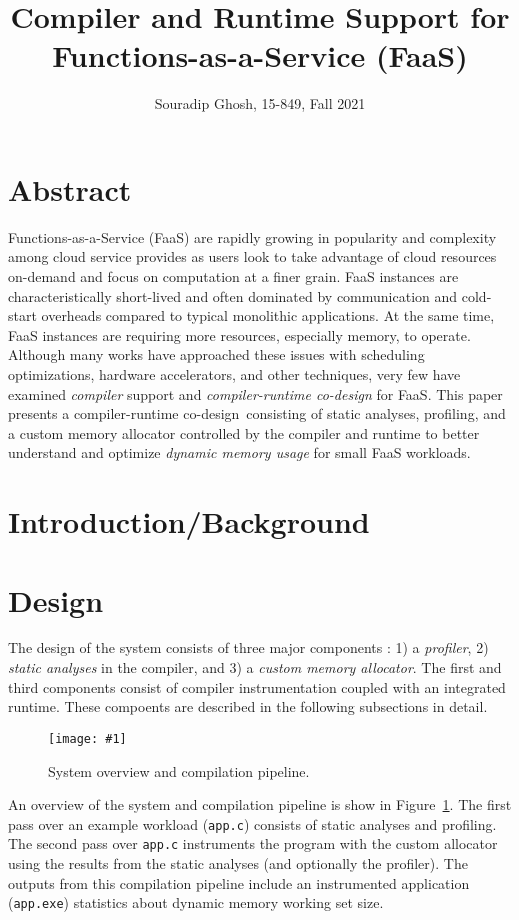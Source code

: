 \documentclass{article}
\title{Compiler and Runtime Support for Functions-as-a-Service (FaaS)}
\date{}
\author{Souradip Ghosh, 15-849, Fall 2021}
\def\pagefig#1{\texttt{[image: \#1]}}
\def\crcd{compiler-runtime co-design}
\begin{document}
\maketitle

\section{Abstract}
Functions-as-a-Service (FaaS) are rapidly growing in popularity and 
complexity among cloud service provides as users look to take 
advantage of cloud resources on-demand and focus on computation
at a finer grain. FaaS instances are characteristically short-lived
and often dominated by communication and cold-start overheads compared
to typical monolithic applications. At the same time, FaaS instances
are requiring more resources, especially memory, to operate. Although
many works have approached these issues with scheduling optimizations,
hardware accelerators, and other techniques, very few have examined
\textit{compiler} support and \textit{\crcd} for FaaS. This paper presents 
a \crcd\ consisting of static analyses, profiling, and a custom memory 
allocator controlled by the compiler and runtime to better understand 
and optimize \textit{dynamic memory usage} for small FaaS workloads.

\section{Introduction/Background}

\section{Design}
The design of the system consists of three major components : 1) a \textit{profiler},
2) \textit{static analyses} in the compiler, and 3) a \textit{custom memory allocator}.
The first and third components consist of compiler instrumentation coupled with an 
integrated runtime. These compoents are described in the following subsections
in detail. 

\begin{figure}
    \centerline{\pagefig{figs/sys.pdf}}
    \caption{System overview and compilation pipeline. }  
	\label{fig:sys}
\end{figure}

An overview of the system and compilation pipeline is show in Figure~\ref{fig:sys}. The 
first pass over an example workload (\texttt{app.c}) consists of static analyses and 
profiling. The second pass over \texttt{app.c} instruments the program with the custom
allocator using the results from the static analyses (and optionally the profiler). The
outputs from this compilation pipeline include an instrumented application (\texttt{app.exe})
statistics about dynamic memory working set size.
\end{document}
